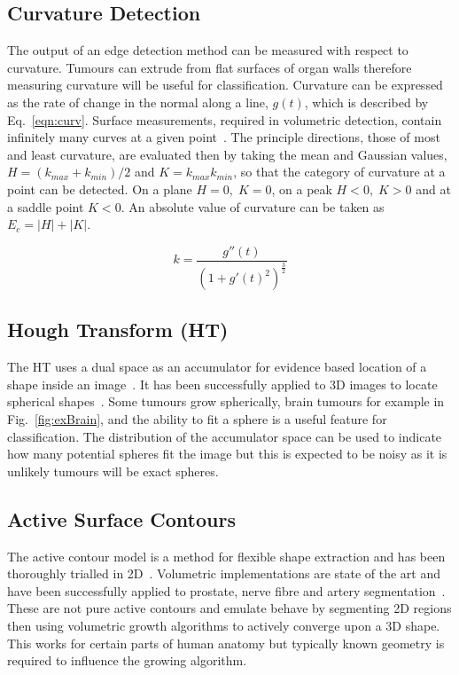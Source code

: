 \documentclass[journal]{IEEEtran}
\begin{document}
\subsection{Curvature Detection}
\label{sec:curvature_detection}
The output of an edge detection method can be measured with respect to curvature.
Tumours can extrude from flat surfaces of organ walls therefore measuring curvature will be useful for classification.
Curvature can be expressed as the rate of change in the normal along a line, $g(t)$, which is described by Eq.~\ref{eqn:curv}.
Surface measurements, required in volumetric detection, contain infinitely many curves at a given point~\cite{lohmann1998volumetric}.
The principle directions, those of most and least curvature, are evaluated then by taking the mean and Gaussian values, $H = (k_{max} + k_{min})/2$ and $K = k_{max}k_{min}$, so that the category of curvature at a point can be detected.
On a plane $H = 0,\;K=0$, on a peak $H<0,\;K>0$ and at a saddle point $K<0$.
An absolute value of curvature can be taken as $E_c=|H|+|K|$.

\begin{equation}
	k = \frac{g''(t)}{(1 + g'(t)^2)^{\frac{3}{2}}}
	\label{eqn:curv}
\end{equation}


\subsection{Hough Transform (HT)}

The HT uses a dual space as an accumulator for evidence based location of a shape inside an image~\cite{nixon02feature}.
It has been successfully applied to 3D images to locate spherical shapes~\cite{abuzaina13hough}.
Some tumours grow spherically, brain tumours for example in Fig.~\ref{fig:exBrain}, and the ability to fit a sphere is a useful feature for classification.
The distribution of the accumulator space can be used to indicate how many potential spheres fit the image but this is expected to be noisy as it is unlikely tumours will be exact spheres.





\subsection{Active Surface Contours}

The active contour model is a method for flexible shape extraction and has been thoroughly trialled in 2D~\cite{nixon02feature}.
Volumetric implementations are state of the art and have been successfully applied to prostate, nerve fibre and artery segmentation~\cite{skalski13automatic,muralidhar12active,xiao12carotid}.
These are not pure active contours and emulate behave by segmenting 2D regions then using volumetric growth algorithms to actively converge upon a 3D shape.
This works for certain parts of human anatomy but typically known geometry is required to influence the growing algorithm. 
\end{document}

